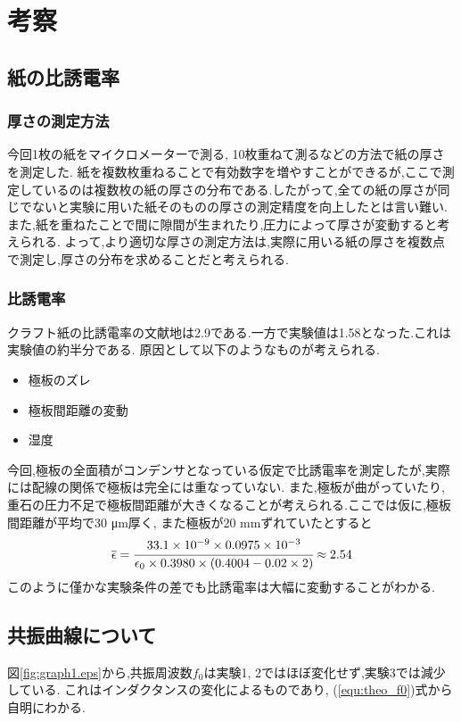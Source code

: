 \section{考察}
\subsection{紙の比誘電率}
\subsubsection{厚さの測定方法}
今回1枚の紙をマイクロメーターで測る, 10枚重ねて測るなどの方法で紙の厚さを測定した.
紙を複数枚重ねることで有効数字を増やすことができるが,ここで測定しているのは複数枚の紙の厚さの分布である.したがって,全ての紙の厚さが同じでないと実験に用いた紙そのものの厚さの測定精度を向上したとは言い難い.
また,紙を重ねたことで間に隙間が生まれたり,圧力によって厚さが変動すると考えられる.
よって,より適切な厚さの測定方法は,実際に用いる紙の厚さを複数点で測定し,厚さの分布を求めることだと考えられる.
\subsubsection{比誘電率}
クラフト紙の比誘電率の文献地は2.9である\cite{rika}.一方で実験値は1.58となった.これは実験値の約半分である.
原因として以下のようなものが考えられる.
\begin{itemize}
  \item 極板のズレ
  \item 極板間距離の変動
  \item 湿度
\end{itemize}
今回,極板の全面積がコンデンサとなっている仮定で比誘電率を測定したが,実際には配線の関係で極板は完全には重なっていない.
また,極板が曲がっていたり,重石の圧力不足で極板間距離が大きくなることが考えられる.ここでは仮に,極板間距離が平均で30 \si{\micro\metre}厚く,
また極板が20 \si{\milli\metre}ずれていたとすると
\begin{align*}
  \overline{\epsilon}=\cfrac{33.1\times10^{-9}\times0.0975\times10^{-3}}{\epsilon_0\times0.3980\times(0.4004-0.02\times2)}\approx2.54
\end{align*}
このように僅かな実験条件の差でも比誘電率は大幅に変動することがわかる.
\subsection{共振曲線について}
図\ref{fig:graph1.eps}から,共振周波数$f_0$は実験1, 2ではほぼ変化せず,実験3では減少している.
これはインダクタンスの変化によるものであり, (\ref{equ:theo_f0})式から自明にわかる.

